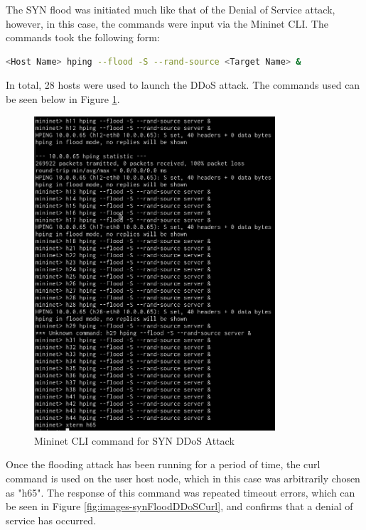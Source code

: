 The SYN flood was initiated much like that of the Denial of Service attack,
however, in this case, the commands were input via the Mininet CLI. The commands
took the following form:

\begin{lstlisting}[language=bash, caption=Mininet CLI commands for SYN DDoS Attack]
	<Host Name> hping --flood -S --rand-source <Target Name> &
\end{lstlisting}

In total, 28 hosts were used to launch the DDoS attack. The commands used can be
seen below in Figure \ref{fig:images-synFloodDDoSCli}.

\begin{figure}[H]
	\centering
	\includegraphics[width=0.8\textwidth]{images/synFloodDDoSCli}
	\caption{Mininet CLI command for SYN DDoS Attack}
	\label{fig:images-synFloodDDoSCli}
\end{figure}

Once the flooding attack has been running for a period of time, the curl command
is used on the user host node, which in this case was arbitrarily chosen as
"h65". The response of this command was repeated timeout errors, which can be
seen in Figure \ref{fig:images-synFloodDDoSCurl}, and confirms that a denial of
service has occurred.

